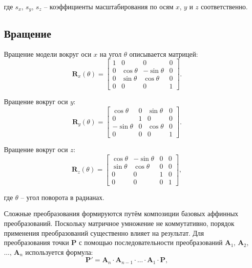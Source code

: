 где $s_x$, $s_y$, $s_z$ -- коэффициенты масштабирования по осям $x$, $y$ и $z$ соответственно.

\subsection*{Вращение}
Вращение модели вокруг оси $x$ на угол $\theta$ описывается матрицей:
\begin{equation}
	\mathbf{R}_x(\theta) = \begin{bmatrix}
		1 & 0 & 0 & 0 \\
		0 & \cos \theta & -\sin \theta & 0 \\
		0 & \sin \theta & \cos \theta & 0 \\
		0 & 0 & 0 & 1
	\end{bmatrix}.
\end{equation}
\newline  

Вращение вокруг оси $y$:
\begin{equation}
	\mathbf{R}_y(\theta) = \begin{bmatrix}
		\cos \theta & 0 & \sin \theta & 0 \\
		0 & 1 & 0 & 0 \\
		-\sin \theta & 0 & \cos \theta & 0 \\
		0 & 0 & 0 & 1
	\end{bmatrix}.
\end{equation}
\newline  

Вращение вокруг оси $z$:
\begin{equation}
	\mathbf{R}_z(\theta) = \begin{bmatrix}
		\cos \theta & -\sin \theta & 0 & 0 \\
		\sin \theta & \cos \theta & 0 & 0 \\
		0 & 0 & 1 & 0 \\
		0 & 0 & 0 & 1
	\end{bmatrix},
\end{equation}

где $\theta$ -- угол поворота в радианах.

Сложные преобразования формируются путём композиции базовых аффинных преобразований. Поскольку матричное умножение не коммутативно, порядок применения преобразований существенно влияет на результат. Для преобразования точки $\mathbf{P}$ с помощью последовательности преобразований $\mathbf{A}_1$, $\mathbf{A}_2$, $\ldots$, $\mathbf{A}_n$ используется формула:
\begin{equation}
	\mathbf{P}' = \mathbf{A}_n \cdot \mathbf{A}_{n-1} \cdot \ldots \cdot \mathbf{A}_1 \cdot \mathbf{P},
\end{equation}

